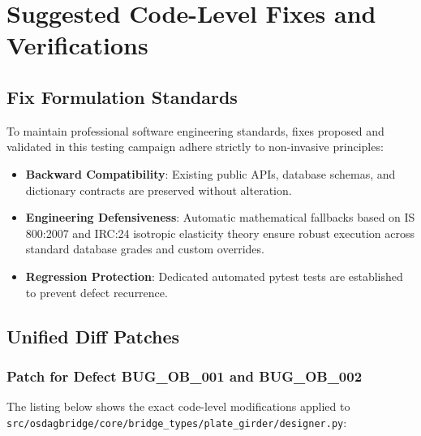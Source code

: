 \chapter{Suggested Code-Level Fixes and Verifications}
\label{chap:suggested_fixes}

\section{Fix Formulation Standards}
To maintain professional software engineering standards, fixes proposed and validated in this testing campaign adhere strictly to non-invasive principles:
\begin{itemize}
    \item \textbf{Backward Compatibility}: Existing public APIs, database schemas, and dictionary contracts are preserved without alteration.
    \item \textbf{Engineering Defensiveness}: Automatic mathematical fallbacks based on IS 800:2007 and IRC:24 isotropic elasticity theory ensure robust execution across standard database grades and custom overrides.
    \item \textbf{Regression Protection}: Dedicated automated pytest tests are established to prevent defect recurrence.
\end{itemize}

\section{Unified Diff Patches}

\subsection{Patch for Defect BUG\_OB\_001 and BUG\_OB\_002}
The listing below shows the exact code-level modifications applied to \texttt{src/osdagbridge/core/bridge_types/plate_girder/designer.py}:

